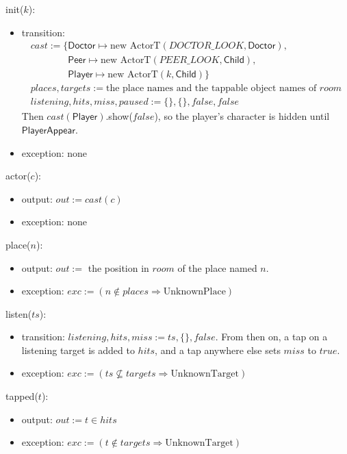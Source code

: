 \documentclass[10pt, titlepage]{article}
\newcommand{\T}[1]{\mathit{#1}}          %
\newcommand{\V}[1]{\mathsf{#1}}          %
\newcommand{\out}{\mathit{out}}
\newcommand{\exc}{\mathit{exc}}
\newcommand{\true}{\mathit{true}}
\newcommand{\false}{\mathit{false}}
\begin{document}
\noindent init($k$):
\begin{itemize}
\item transition:
  \[\begin{array}{l}
  \T{cast} := \{\V{Doctor} \mapsto \text{new ActorT}(\T{DOCTOR\_LOOK},
  \V{Doctor}),\\
  \phantom{\T{cast} := \{}\V{Peer} \mapsto \text{new ActorT}(\T{PEER\_LOOK},
  \V{Child}),\\
  \phantom{\T{cast} := \{}\V{Player} \mapsto \text{new ActorT}(k,
  \V{Child})\}\\
  \T{places}, \T{targets} := \text{the place names and the tappable object
  names of } \T{room}\\
  \T{listening}, \T{hits}, \T{miss}, \T{paused} := \{\}, \{\}, \false,
  \false
  \end{array}\]
  Then $\T{cast}(\V{Player})$.show($\false$), so the player's character is
  hidden until $\V{PlayerAppear}$.
\item exception: none
\end{itemize}

\noindent actor($c$):
\begin{itemize}
\item output: $\out := \T{cast}(c)$
\item exception: none
\end{itemize}

\noindent place($n$):
\begin{itemize}
\item output: $\out :=$ the position in $\T{room}$ of the place named $n$.
\item exception: $\exc := (n \notin \T{places} \Rightarrow
  \text{UnknownPlace})$
\end{itemize}

\noindent listen($\T{ts}$):
\begin{itemize}
\item transition: $\T{listening}, \T{hits}, \T{miss} := \T{ts}, \{\},
  \false$. From then on, a tap on a listening target is added to $\T{hits}$,
  and a tap anywhere else sets $\T{miss}$ to $\true$.
\item exception: $\exc := (\T{ts} \not\subseteq \T{targets} \Rightarrow
  \text{UnknownTarget})$
\end{itemize}

\noindent tapped($t$):
\begin{itemize}
\item output: $\out := t \in \T{hits}$
\item exception: $\exc := (t \notin \T{targets} \Rightarrow
  \text{UnknownTarget})$
\end{itemize}
\end{document}
